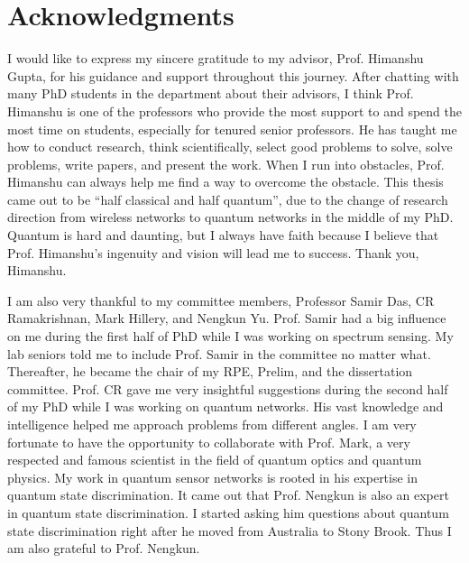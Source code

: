 \chapter{Acknowledgments}


I would like to express my sincere gratitude to my advisor, Prof. Himanshu Gupta, for his guidance and support throughout this journey. 
After chatting with many PhD students in the department about their advisors, I think Prof. Himanshu is one of the professors who provide 
the most support to and spend the most time on students, especially for tenured senior professors.
He has taught me how to conduct research, think scientifically, select good problems to solve, solve problems, write papers, and present the work.
When I run into obstacles, Prof. Himanshu can always help me find a way to overcome the obstacle.
This thesis came out to be ``half classical and half quantum'', due to the change of research direction from wireless networks to
quantum networks in the middle of my PhD. Quantum is hard and daunting, but I always have faith because I believe that 
Prof. Himanshu's ingenuity and vision will lead me to success. Thank you, Himanshu.

I am also very thankful to my committee members, Professor Samir Das, CR Ramakrishnan, Mark Hillery, and Nengkun Yu. 
Prof. Samir had a big influence on me during the first half of PhD while I was working on spectrum sensing.
My lab seniors told me to include Prof. Samir in the committee no matter what. 
Thereafter, he became the chair of my RPE, Prelim, and the dissertation committee.
Prof. CR gave me very insightful suggestions during the second half of my PhD while I was working on quantum networks.
His vast knowledge and intelligence helped me approach problems from different angles.
I am very fortunate to have the opportunity to collaborate with Prof. Mark, a very respected and famous scientist 
in the field of quantum optics and quantum physics. My work in quantum sensor networks is rooted in his expertise in quantum state discrimination.
It came out that Prof. Nengkun is also an expert in quantum state discrimination. I started asking him questions about quantum state discrimination right after
he moved from Australia to Stony Brook. Thus I am also grateful to Prof. Nengkun.

